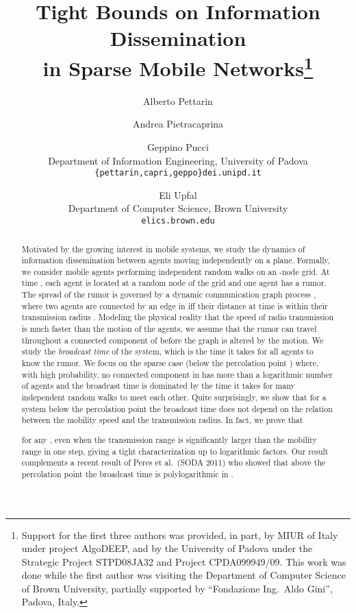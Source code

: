 \documentclass[11pt]{article}
\newcommand{\tf}[1]{\small{#1}}
\begin{document}
\title{Tight Bounds on Information Dissemination\\ in Sparse Mobile Networks\thanks{Support for the first three authors was provided, in part, by MIUR of Italy
	under project AlgoDEEP, and by the University of
	Padova under the Strategic Project STPD08JA32 and Project
	CPDA099949/09.
	This work was done while the first author was visiting the Department of Computer Science of Brown University,
	partially supported by ``Fondazione Ing.~Aldo Gini'', Padova, Italy.}}

\author{
Alberto Pettarin\and Andrea Pietracaprina\and Geppino Pucci\\
	\tf{Department of Information Engineering,} \tf{University of Padova}\\
	\tf{\texttt{\{pettarin,capri,geppo\}dei.unipd.it}}
\and Eli Upfal\\
	\tf{Department of Computer Science,} \tf{Brown University}\\
	\tf{\texttt{elics.brown.edu}}
}

\date{}
\maketitle{}

\begin{abstract}
Motivated by the growing interest in mobile systems,
we study the dynamics of information dissemination
between agents moving independently on a plane.
Formally, we consider  mobile agents
performing independent random walks on an -node grid.
At time , each agent is located
at a random node of the grid and one agent has a rumor.
The spread of the rumor is governed by
a dynamic communication graph process ,
where two agents are connected by an edge in  iff
their distance at time  is within their transmission radius .
Modeling the physical reality
that the speed of radio transmission
is much faster than the motion of the agents,
we assume that the rumor can travel
throughout a connected component of 
before the graph is altered by the motion.
We study the \emph{broadcast time}  of the system,
which is the time it takes for all agents to know the rumor.
We focus on the sparse case
(below the percolation point )
where, with high probability,
no connected component in  has more than
a logarithmic number of agents
and the broadcast time is dominated by the time
it takes for many independent random walks
to meet each other.
Quite surprisingly,
we show that for a system below the percolation point
the broadcast time does not depend on the relation between
the mobility speed and the transmission radius.
In fact, we prove that

for any ,
even when the transmission range is significantly larger
than the mobility range in one step,
giving a tight characterization up to logarithmic factors.
Our result complements a recent result of
Peres et al.~(SODA 2011)
who showed that above the percolation point
the broadcast time is polylogarithmic in .
\end{abstract}
\end{document}
